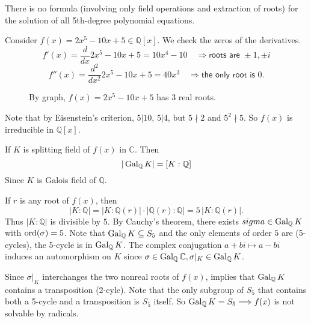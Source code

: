 \begin{example}
    There is no formula (involving only field operations and extraction of roots) for the 
    solution of all 5th-degree polynomial equations.
\end{example}
\begin{solution}
    Consider $f(x) = 2x^5 - 10x + 5 \in \mathbb{Q}[x]$. We check the zeros of the derivatives.
    \[
        f'(x) = \frac{d}{dx} 2x^5 - 10x + 5 = 10x^4 - 10 \quad \Longrightarrow \textsf{roots are } \pm 1, \pm i
    \]
    \[
        f''(x) = \frac{d^2}{dx^2} 2x^5 - 10x + 5 = 40x^3 \quad \Longrightarrow \textsf{the only root is } 0.
    \]

    \begin{figure}[ht]
        \pgfplotsset{compat=1.16}
        \begin{center}
        \end{center}
        \caption{By graph, $f(x) = 2x^5 - 10x + 5$ has 3 real roots.}
    \end{figure}

    Note that by Eisenstein's criterion, $5|10$, $5|4$, but $5 \nmid 2$ and $5^2 \nmid 5$. So $f(x)$ 
    is irreducible in $\mathbb{Q}[x]$. 

    If $K$ is splitting field of $f(x)$ in $\mathbb{C}$. Then 
    \[
    |\operatorname{Gal}_\mathbb{Q} K| = [K:\mathbb{Q}]
    \]
    Since $K$ is Galois field of $\mathbb{Q}$.

    If $r$ is any root of $f(x)$, then 
    \[
        |K:\mathbb{Q}| = |K: \mathbb{Q}(r)| \cdot |\mathbb{Q}(r) : \mathbb{Q}| = 5\, |K: \mathbb{Q}(r)|.
    \]
    Thus $|K : \mathbb{Q}|$ is divisible by $5$. By Cauchy's theorem, there exists $sigma \in \operatorname{Gal}_\mathbb{Q} K$ with 
    $\operatorname{ord}(\sigma) = 5$. Note that $\operatorname{Gal}_\mathbb{Q} K \subseteq S_5$ and the only elements of order 
    $5$ are (5-cycles), the 5-cycle is in $\operatorname{Gal}_\mathbb{Q} K$. The complex conjugation $a + bi \mapsto a -bi$ 
    induces an automorphism on $K$ since $\sigma \in \operatorname{Gal}_\mathbb{Q} \mathbb{C}, \sigma \vert_K \in \operatorname{Gal}_\mathbb{Q} K$.
    
    Since $\sigma \vert_K$ interchanges the two nonreal roots of $f(x)$, implies that 
    $\operatorname{Gal}_{\mathbb{Q}} K$ contains a transposition (2-cyle). Note that the only 
    subgroup of $S_5$ that contains both a 5-cycle and a transposition is $S_5$ itself.
    So $\operatorname{Gal}_\mathbb{Q} K = S_5 \Longrightarrow f(x)$ is not solvable by radicals. 

\end{solution}

